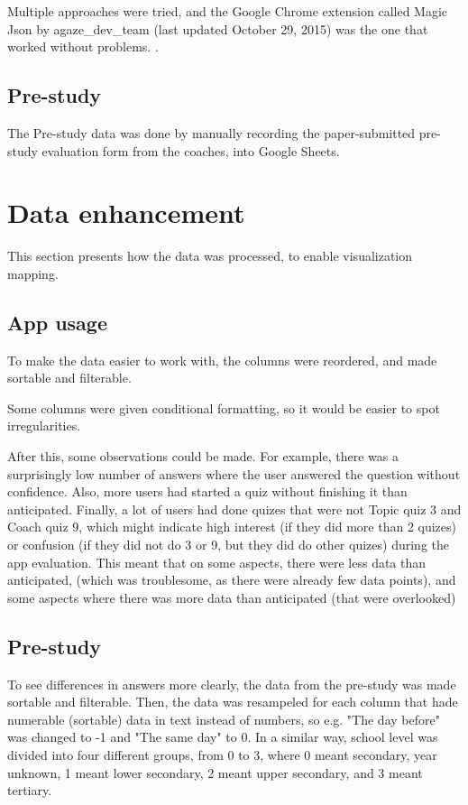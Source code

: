 Multiple approaches were tried, and the Google Chrome extension called Magic Json by agaze\_dev\_team (last updated October 29, 2015) %
was the one that worked without problems. \cite{agaze}.

\subsection{Pre-study}

The Pre-study data was done by manually recording the paper-submitted pre-study evaluation form from the coaches, into Google Sheets.

\section{Data enhancement}

This section presents how the data was processed, to enable visualization mapping.

\subsection{App usage}
To make the data easier to work with, the columns were reordered, and made sortable and filterable.

Some columns were given conditional formatting, so it would be easier to spot irregularities.


After this, some observations could be made. For example, there was a surprisingly low number of answers where the user answered the question without confidence. Also, more users had started a quiz without finishing it than anticipated. Finally, a lot of users had done quizes that were not Topic quiz 3 and Coach quiz 9, which might indicate high interest (if they did more than 2 quizes) or confusion (if they did not do 3 or 9, but they did do other quizes) during the app evaluation. This meant that on some aspects, there were less data than anticipated, (which was troublesome, as there were already few data points), and some aspects where there was more data than anticipated (that were overlooked)

\subsection{Pre-study}
To see differences in answers more clearly, the data from the pre-study was made sortable and filterable. Then, the data was resampeled for each column that hade numerable (sortable) data in text instead of numbers, so e.g. "The day before" was changed to -1 and "The same day" to 0. In a similar way, school level was divided into four different groups, from 0 to 3, where 0 meant secondary, year unknown, 1 meant lower secondary, 2 meant upper secondary, and 3 meant tertiary.

